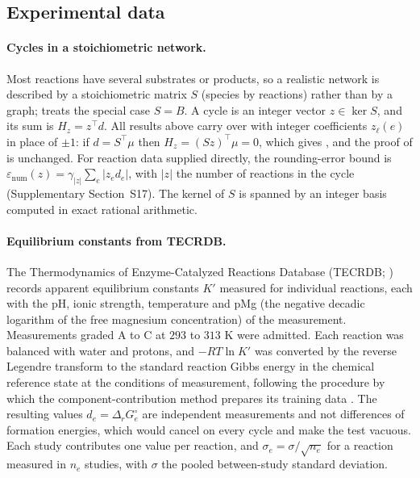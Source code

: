 \documentclass[11pt,a4paper]{article}
\theoremstyle{pstyle}
\theoremstyle{definition}
\theoremstyle{remark}
\newcommand{\abs}[1]{\lvert#1\rvert}
\newcommand{\eps}{\varepsilon}
\newcommand{\epsnum}{\eps_{\mathrm{num}}}
\newcommand{\hol}{H}
\begin{document}
\subsection{Experimental data}
\label{sec:data}

\paragraph{Cycles in a stoichiometric network.} Most reactions have
several substrates or products, so a realistic network is described by
a stoichiometric matrix $S$ (species by reactions) rather than by a
graph;  treats the special case $S=B$. A cycle is an
integer vector $z\in\ker S$, and its sum is $\hol_z=z^{\top}d$. All
results above carry over with integer coefficients $z_\ell(e)$ in place
of $\pm1$: if $d=S^{\top}\mu$ then $\hol_z=(Sz)^{\top}\mu=0$, which gives
, and the proof of
 is unchanged. For reaction data supplied directly,
the rounding-error bound is
$\epsnum(z)=\gamma_{\abs{z}}\sum_e\abs{z_e d_e}$, with $\abs{z}$ the
number of reactions in the cycle (Supplementary Section~S17). The kernel
of $S$ is spanned by an integer basis computed in exact rational
arithmetic.

\paragraph{Equilibrium constants from TECRDB.} The Thermodynamics of
Enzyme-Catalyzed Reactions Database (TECRDB; \citealp{goldberg2004})
records apparent equilibrium constants $K'$ measured for individual
reactions, each with the pH, ionic strength, temperature and pMg (the
negative decadic logarithm of the free magnesium concentration) of the
measurement. Measurements graded A to C at $293$ to $313$ K were
admitted. Each reaction was balanced with water and protons, and
$-RT\ln K'$ was converted by the reverse Legendre transform to the
standard reaction Gibbs energy in the chemical reference state at the
conditions of measurement, following the procedure by which the
component-contribution method prepares its training data
\citep{noor2013,beber2022}. The resulting values
$d_e=\Delta_rG^{\circ}_e$ are independent measurements and not
differences of formation energies, which would cancel on every cycle
and make the test vacuous. Each study contributes one value per
reaction, and $\sigma_e=\sigma/\sqrt{n_e}$ for a reaction measured in
$n_e$ studies, with $\sigma$ the pooled between-study standard
deviation.
\end{document}
